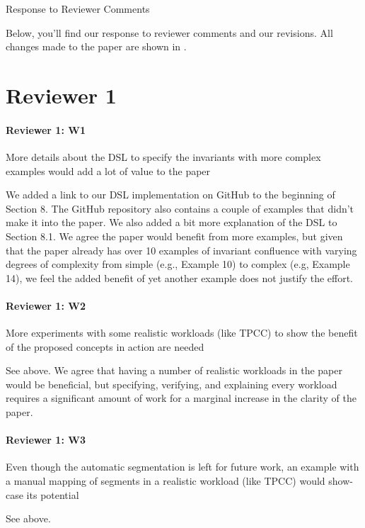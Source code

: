 \documentclass[9pt]{article}
\begin{document}
\begin{center}
  \ttlfnt Response to Reviewer Comments
\end{center}

\begin{multicols*}{2}
Below, you'll find our response to reviewer comments and our revisions. All
changes made to the paper are shown in .

\section*{Reviewer 1}
\paragraph{Reviewer 1: W1}
\begin{feedback}
  More details about the DSL to specify the invariants with more complex
  examples would add a lot of value to the paper
\end{feedback}
We added a link to our DSL implementation on GitHub to the beginning of Section
8. The GitHub repository also contains a couple of examples that didn't make it
into the paper. We also added a bit more explanation of the DSL to Section 8.1.
We agree the paper would benefit from more examples, but given that the paper
already has over 10 examples of invariant confluence with varying degrees of
complexity from simple (e.g., Example 10) to complex (e.g, Example 14), we feel
the added benefit of yet another example does not justify the effort.

\paragraph{Reviewer 1: W2}
\begin{feedback}
  More experiments with some realistic workloads (like TPCC) to show the
  benefit of the proposed concepts in action are needed
\end{feedback}
See above. We agree that having a number of realistic workloads in the paper
would be beneficial, but specifying, verifying, and explaining every workload
requires a significant amount of work for a marginal increase in the clarity of
the paper.

\paragraph{Reviewer 1: W3}
\begin{feedback}
  Even though the automatic segmentation is left for future work, an example
  with a manual mapping of segments in a realistic workload (like TPCC) would
  show-case its potential
\end{feedback}
See above.


\end{multicols*}
\end{document}
